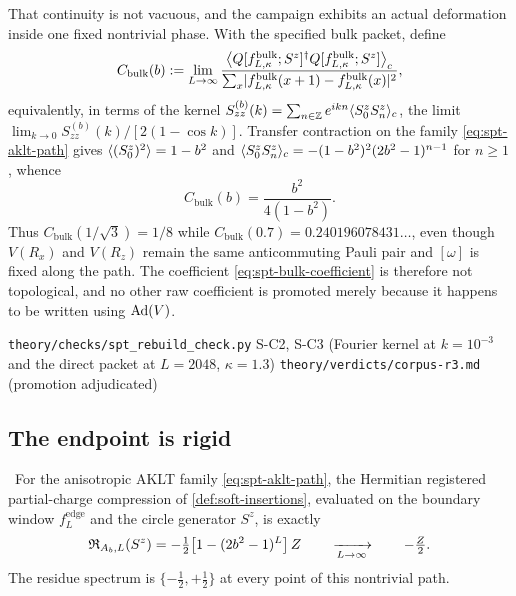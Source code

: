 That continuity is not vacuous, and the campaign exhibits an actual
deformation inside one fixed nontrivial phase. With the specified bulk packet,
define
\begin{equation}
  C_{\mathrm{bulk}}(b)
   :=\lim_{L\to\infty}
     \frac{\bigl\langle Q[f^{\mathrm{bulk}}_{L,\kappa};S^{z}]^{\dagger}
                        Q[f^{\mathrm{bulk}}_{L,\kappa};S^{z}]\bigr\rangle_c}
          {\sum_x\lvert f^{\mathrm{bulk}}_{L,\kappa}(x+1)
                     -f^{\mathrm{bulk}}_{L,\kappa}(x)\rvert^{2}},
  \label{eq:spt-bulk-coefficient}
\end{equation}
equivalently, in terms of the kernel
$S^{(b)}_{zz}(k)=\sum_{n\in\mathbb{Z}}e^{ikn}\langle S^{z}_0S^{z}_n\rangle_c$, the limit
$\lim_{k\to0}S^{(b)}_{zz}(k)/[2(1-\cos k)]$. Transfer contraction on the
family \eqref{eq:spt-aklt-path} gives $\langle (S^{z}_0)^{2}\rangle=1-b^{2}$ and
$\langle S^{z}_0S^{z}_n\rangle_c=-(1-b^{2})^{2}(2b^{2}-1)^{n-1}$ for $n\ge1$, whence
\begin{equation}
  C_{\mathrm{bulk}}(b)=\frac{b^{2}}{4(1-b^{2})} .
  \label{eq:spt-bulk-value}
\end{equation}
Thus $C_{\mathrm{bulk}}(1/\sqrt3)=1/8$ while
$C_{\mathrm{bulk}}(0.7)=0.240196078431\ldots$, even though $V(R_x)$ and
$V(R_z)$ remain the same anticommuting Pauli pair and $[\omega]$ is fixed
along the path. The coefficient \eqref{eq:spt-bulk-coefficient} is therefore
not topological, and no other raw coefficient is promoted merely because it
happens to be written using $\operatorname{Ad}(V)$.

%
{\texttt{theory/checks/spt\_rebuild\_check.py} S-C2, S-C3 (Fourier kernel at
$k=10^{-3}$ and the direct packet at $L=2048$, $\kappa=1.3$)}%
{\texttt{theory/verdicts/corpus-r3.md} (promotion adjudicated)}

\subsection{The endpoint is rigid}

\begin{theorem}\label{thm:aklt-residue}
\statusProved\ For the anisotropic AKLT family \eqref{eq:spt-aklt-path}, the
Hermitian registered partial-charge compression of
\cref{def:soft-insertions}, evaluated on the boundary window
$f^{\mathrm{edge}}_L$ and the circle generator $S^{z}$, is exactly
\begin{equation}
  \mathfrak{R}_{A_b,L}(S^{z})
   = -\tfrac12\bigl[1-(2b^{2}-1)^{L}\bigr]\,Z
   \qquad\xrightarrow[L\to\infty]{}\qquad -\tfrac{Z}{2}.
  \label{eq:spt-aklt-residue}
\end{equation}
The residue spectrum is $\{-\tfrac12,+\tfrac12\}$ at every point of this
nontrivial path.
\end{theorem}

